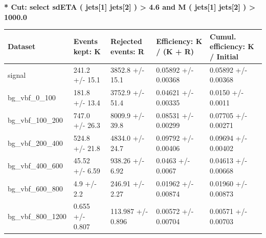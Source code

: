 \documentclass[a4paper, 10pt]{article}
\begin{document}
\textbf{* Cut: select sdETA ( jets[1] jets[2] ) > 4.6 and M ( jets[1] jets[2] ) > 1000.0}\\
   \begin{table}[H]
  \begin{center}
    \begin{tabular}{|m{20.0mm}|m{27.0mm}|m{27.0mm}|m{33.0mm}|m{32.0mm}|}
      \hline
      {\cellcolor{yellow}         Dataset}& {\cellcolor{yellow}         Events kept:
          K}& {\cellcolor{yellow}         Rejected events:
          R}& {\cellcolor{yellow}         Efficiency:
          K /\- (K + R)}& {\cellcolor{yellow}         Cumul. efficiency:
          K /\- Initial}\\
      \hline
      {\cellcolor{white}         signal}& {\cellcolor{white}         241.2 +/\-- 15.1}& {\cellcolor{white}         3852.8 +/\-- 15.1}& {\cellcolor{white}         0.05892 +/\-- 0.00368}& {\cellcolor{white}         0.05892 +/\-- 0.00368}\\
      \hline
      {\cellcolor{white}         bg\_vbf\_0\_100}& {\cellcolor{white}         181.8 +/\-- 13.4}& {\cellcolor{white}         3752.9 +/\-- 51.4}& {\cellcolor{white}         0.04621 +/\-- 0.00335}& {\cellcolor{white}         0.0150 +/\-- 0.0011}\\
      \hline
      {\cellcolor{white}         bg\_vbf\_100\_200}& {\cellcolor{white}         747.0 +/\-- 26.3}& {\cellcolor{white}         8009.9 +/\-- 39.8}& {\cellcolor{white}         0.08531 +/\-- 0.00299}& {\cellcolor{white}         0.07705 +/\-- 0.00271}\\
      \hline
      {\cellcolor{white}         bg\_vbf\_200\_400}& {\cellcolor{white}         524.8 +/\-- 21.8}& {\cellcolor{white}         4834.0 +/\-- 24.7}& {\cellcolor{white}         0.09792 +/\-- 0.00406}& {\cellcolor{white}         0.09694 +/\-- 0.00402}\\
      \hline
      {\cellcolor{white}         bg\_vbf\_400\_600}& {\cellcolor{white}         45.52 +/\-- 6.59}& {\cellcolor{white}         938.26 +/\-- 6.92}& {\cellcolor{white}         0.0463 +/\-- 0.0067}& {\cellcolor{white}         0.04613 +/\-- 0.00668}\\
      \hline
      {\cellcolor{white}         bg\_vbf\_600\_800}& {\cellcolor{white}         4.9 +/\-- 2.2}& {\cellcolor{white}         246.91 +/\-- 2.27}& {\cellcolor{white}         0.01962 +/\-- 0.00874}& {\cellcolor{white}         0.01960 +/\-- 0.00873}\\
      \hline
      {\cellcolor{white}         bg\_vbf\_800\_1200}& {\cellcolor{white}         0.655 +/\-- 0.807}& {\cellcolor{white}         113.987 +/\-- 0.896}& {\cellcolor{white}         0.00572 +/\-- 0.00704}& {\cellcolor{white}         0.00571 +/\-- 0.00703}\\

\end{tabular}
\end{center}
\end{table}
\end{document}
